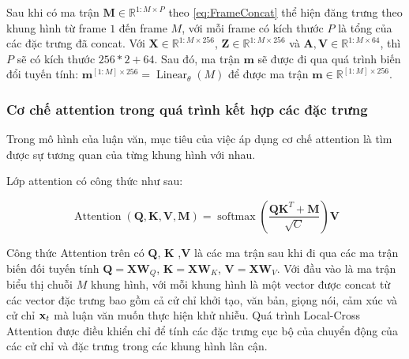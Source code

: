 Sau khi có ma trận $\mathbf{M} \in \mathbb{R}^{1:M \times P}$ theo \autoref{eq:FrameConcat} thể hiện đăng trưng theo khung hình từ frame $1$ đến frame $M$, với mỗi frame có kích thước $P$ là tổng của các đặc trưng đã concat. Với $\mathbf{X} \in \mathbb{R}^{1:M \times 256}$, $\mathbf{Z} \in \mathbb{R}^{1:M \times 256}$ và $\mathbf{A}, \mathbf{V} \in \mathbb{R}^{1:M \times 64}$, thì $P$ sẽ có kích thước $256 * 2 + 64$. Sau đó, ma trận $\mathbf{m}$ sẽ được đi qua quá trình biến đổi tuyến tính: $\mathbf{m}^{[1:M] \times 256} = \operatorname{Linear}_{\theta}(M)$ để được ma trận $\mathbf{m} \in \mathbb{R}^{[1:M] \times 256}$.




\subsubsection{Cơ chế attention trong quá trình kết hợp các đặc trưng}

Trong mô hình của luận văn, mục tiêu của việc áp dụng cơ chế attention là tìm được sự tương quan của từng khung hình với nhau.

Lớp attention có công thức như sau:


\begin{equation} \label{eq:attention}
	\operatorname{Attention}(\mathbf{Q}, \mathbf{K}, \mathbf{V}, \mathbf{M})=\operatorname{softmax}\left(\frac{\mathbf{Q} \mathbf{K}^{T}+\mathbf{M}}{\sqrt{C}}\right) \mathbf{V}
\end{equation}

Công thức Attention trên có $\mathbf{Q}$, $\mathbf{K}$ ,$\mathbf{V}$ là các ma trận sau khi đi qua các ma trận biến đối tuyến tính $\mathbf{Q} = \mathbf{X} \mathbf{W}_Q$, $\mathbf{K} = \mathbf{X} \mathbf{W}_K$, $\mathbf{V} = \mathbf{X} \mathbf{W}_V$. Với đầu vào là ma trận biểu thị chuỗi $M$ khung hình, với mỗi khung hình là một vector được concat từ các vector đặc trưng bao gồm cả cử chỉ khởi tạo, văn bản, giọng nói, cảm xúc và cử chỉ $\mathbf{x}_t$ mà luận văn muốn thực hiện khử nhiễu. Quá trình Local-Cross Attention được điều khiển chỉ để tính các đặc trưng cục bộ của chuyển động của các cử chỉ và đặc trưng trong các khung hình lân cận.

